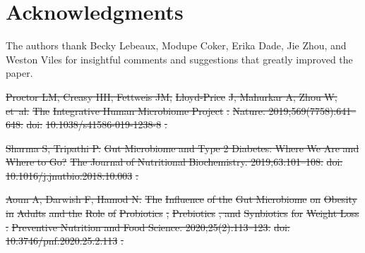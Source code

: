 \documentclass[10pt,letterpaper]{article}
\providecommand{\DIFdeltex}[1]{{\protect\color{red}\sout{#1}}}                      %
\providecommand{\DIFaddbegin}{} %
\providecommand{\DIFaddend}{} %
\providecommand{\DIFdelbegin}{} %
\providecommand{\DIFdel}[1]{\texorpdfstring{\DIFdeltex{#1}}{}} %
\newcommand{\DIFscaledelfig}{0.5}
\newlength{\DIFdelgraphicswidth} %
\newlength{\DIFdelgraphicsheight} %
\newcommand{\DIFaddincludegraphics}[2][]{{\color{blue}\fbox{\DIFOincludegraphics[#1]{#2}}}} %
\newcommand{\DIFdelincludegraphics}[2][]{%
\sbox{\DIFdelgraphicsbox}{\DIFOincludegraphics[#1]{#2}}%
\settoboxwidth{\DIFdelgraphicswidth}{\DIFdelgraphicsbox} %
\settoboxtotalheight{\DIFdelgraphicsheight}{\DIFdelgraphicsbox} %
\scalebox{\DIFscaledelfig}{%
\parbox[b]{\DIFdelgraphicswidth}{\usebox{\DIFdelgraphicsbox}\\[-\baselineskip] \rule{\DIFdelgraphicswidth}{0em}}\llap{\resizebox{\DIFdelgraphicswidth}{\DIFdelgraphicsheight}{%
\setlength{\unitlength}{\DIFdelgraphicswidth}%
\begin{picture}(1,1)%
\thicklines\linethickness{2pt} %
{\color[rgb]{1,0,0}\put(0,0){\framebox(1,1){}}}%
{\color[rgb]{1,0,0}\put(0,0){\line( 1,1){1}}}%
{\color[rgb]{1,0,0}\put(0,1){\line(1,-1){1}}}%
\end{picture}%
}\hspace*{3pt}}} %
} %
\DeclareRobustCommand{\DIFaddbegin}{\DIFOaddbegin \let\includegraphics\DIFaddincludegraphics} %
\DeclareRobustCommand{\DIFaddend}{\DIFOaddend \let\includegraphics\DIFOincludegraphics} %
\DeclareRobustCommand{\DIFdelbegin}{\DIFOdelbegin \let\includegraphics\DIFdelincludegraphics} %
\begin{document}
\section*{Acknowledgments}
The authors thank Becky Lebeaux, Modupe Coker, Erika Dade, Jie Zhou, and Weston Viles for insightful comments and suggestions that greatly improved the paper. 

\nolinenumbers
%
%
% 

\DIFaddbegin {}
\DIFaddend 



\DIFdelbegin %

\DIFdel{Proctor LM, Creasy HH, Fettweis JM, }%
\DIFdel{Lloyd-Price}%
\DIFdel{J, Mahurkar A, Zhou W, et~al.
}%
\DIFdel{The }%
\DIFdel{Integrative Human Microbiome Project}%
\DIFdel{.
}%
\DIFdel{Nature. 2019;569(7758):641--648.
}%
\DIFdel{doi:}%
\DIFdel{10.1038/s41586-019-1238-8}%
\DIFdel{.
}%

\DIFdel{Sharma S, Tripathi P.
}%
\DIFdel{Gut Microbiome and Type 2 Diabetes: Where We Are and Where to Go?
}%
\DIFdel{The Journal of Nutritional Biochemistry. 2019;63:101--108.
}%
\DIFdel{doi:}%
\DIFdel{10.1016/j.jnutbio.2018.10.003}%
\DIFdel{.
}%

\DIFdel{Aoun A, Darwish F, Hamod N.
}%
\DIFdel{The }%
\DIFdel{Influence}%
\DIFdel{of the }%
\DIFdel{Gut Microbiome}%
\DIFdel{on }%
\DIFdel{Obesity}%
\DIFdel{in
  }%
\DIFdel{Adults}%
\DIFdel{and the }%
\DIFdel{Role}%
\DIFdel{of }%
\DIFdel{Probiotics}%
\DIFdel{, }%
\DIFdel{Prebiotics}%
\DIFdel{, and
  }%
\DIFdel{Synbiotics}%
\DIFdel{for }%
\DIFdel{Weight Loss}%
\DIFdel{.
}%
\DIFdel{Preventive Nutrition and Food Science. 2020;25(2):113--123.
}%
\DIFdel{doi:}%
\DIFdel{10.3746/pnf.2020.25.2.113}%
\DIFdel{.
}%
\end{document}
